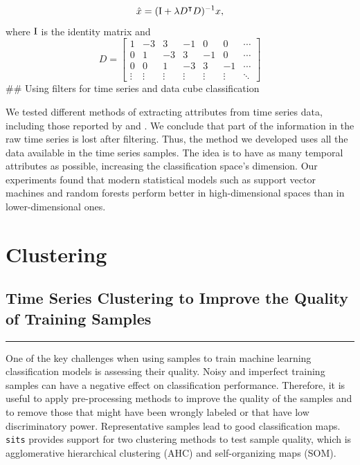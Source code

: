 \documentclass[a4paper,]{tufte-book}
\begin{document}
\[
  \hat{x} = ({\rm I} + \lambda {D}^{\intercal} D)^{-1}x,
\]
where \({\rm I}\) is the identity matrix and
\[
  D = \left[\begin{array}{ccccccc}
             1 & -3 & 3 & -1 & 0 & 0 &\cdots \\
             0 & 1 & -3 & 3 & -1 & 0 &\cdots \\
             0 & 0 & 1 & -3 & 3 & -1 & \cdots \\
             \vdots & \vdots & \vdots & \vdots & \vdots & \vdots & \ddots
             \end{array}
             \right]
\]
\#\# Using filters for time series and data cube classification

We tested different methods of extracting attributes from time series data, including those reported by \citet{Pelletier2016} and \citet{Kastens2017}. We conclude that part of the information in the raw time series is lost after filtering. Thus, the method we developed uses all the data available in the time series samples. The idea is to have as many temporal attributes as possible, increasing the classification space's dimension. Our experiments found that modern statistical models such as support vector machines and random forests perform better in high-dimensional spaces than in lower-dimensional ones.

\hypertarget{part-clustering}{%
\part{Clustering}\label{part-clustering}}

\hypertarget{time-series-clustering-to-improve-the-quality-of-training-samples}{%
\chapter{Time Series Clustering to Improve the Quality of Training Samples}\label{time-series-clustering-to-improve-the-quality-of-training-samples}}

\begin{center}\rule{0.5\linewidth}{0.5pt}\end{center}

One of the key challenges when using samples to train machine learning classification models is assessing their quality. Noisy and imperfect training samples can have a negative effect on classification performance. Therefore, it is useful to apply pre-processing methods to improve the quality of the samples and to remove those that might have been wrongly labeled or that have low discriminatory power. Representative samples lead to good classification maps. \texttt{sits} provides support for two clustering methods to test sample quality, which is agglomerative hierarchical clustering (AHC) and self-organizing maps (SOM).
\end{document}
